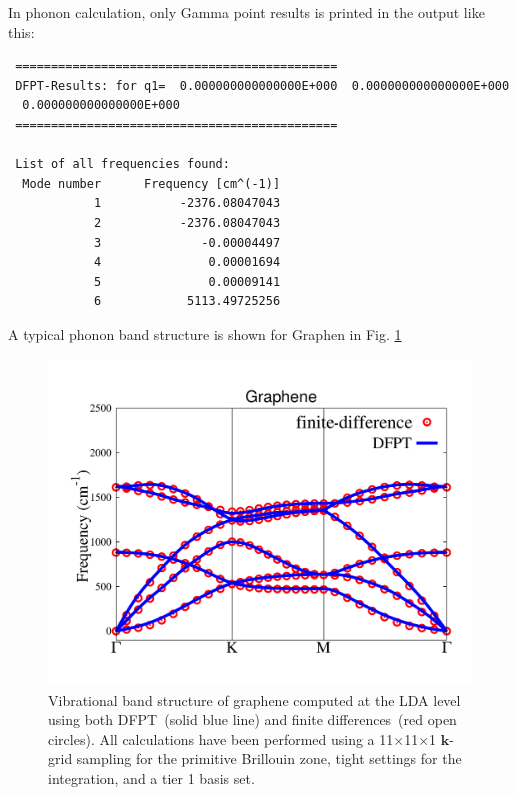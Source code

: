 In phonon calculation, only Gamma point results is printed in the output like this:
{\footnotesize
\begin{verbatim}
 =============================================
 DFPT-Results: for q1=  0.000000000000000E+000  0.000000000000000E+000
  0.000000000000000E+000
 =============================================

 List of all frequencies found:
  Mode number      Frequency [cm^(-1)]
            1           -2376.08047043
            2           -2376.08047043
            3              -0.00004497
            4               0.00001694
            5               0.00009141
            6            5113.49725256
\end{verbatim}
}

A typical phonon band structure is shown for Graphen in Fig. \ref{fig:graphen}

\begin{figure}
\includegraphics[width=1.0\columnwidth]{graphen_phonon_compare}
\caption{Vibrational band structure of graphene computed at the LDA level using
both DFPT~(solid blue line) and finite differences~(red open circles). All calculations
have been performed using a 11$\times$11$\times$1 $\mathbf{k}$-grid sampling for the 
primitive Brillouin zone, tight settings for the
integration, and a tier 1 basis set.}
\label{fig:graphen}
\end{figure}

